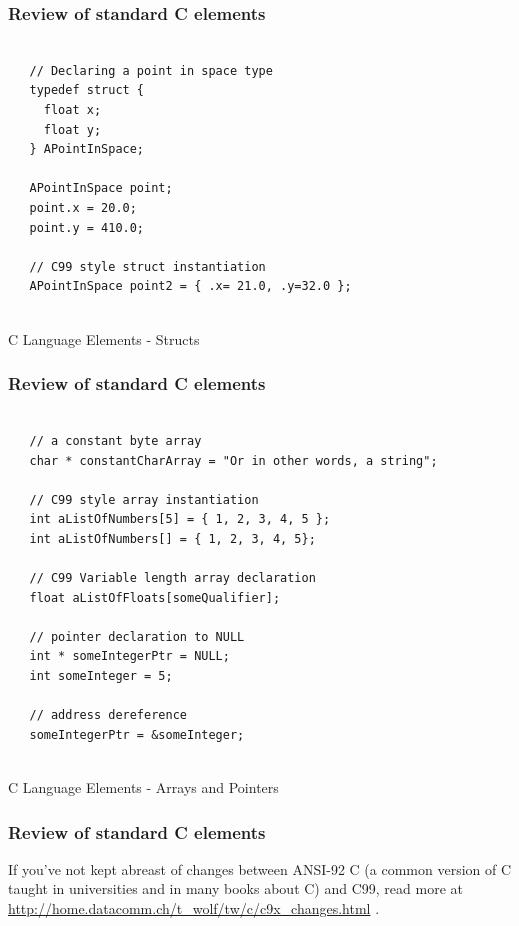 \documentclass[10pt]{beamer}
\begin{document}
\begin{frame}[fragile]
  \frametitle{Review of standard C elements}
  \begin{listing}[H]
     \begin{verbatim}
   
   // Declaring a point in space type
   typedef struct {
     float x;
     float y;
   } APointInSpace;
   
   APointInSpace point;
   point.x = 20.0;
   point.y = 410.0;
   
   // C99 style struct instantiation
   APointInSpace point2 = { .x= 21.0, .y=32.0 };
              
   \end{verbatim}
     \caption{C Language Elements - Structs}
     \label{listing:2}
   \end{listing}

\end{frame}

\begin{frame}[fragile]
  \frametitle{Review of standard C elements}
  \begin{listing}[H]
     \begin{verbatim}
   
   // a constant byte array
   char * constantCharArray = "Or in other words, a string";
   
   // C99 style array instantiation
   int aListOfNumbers[5] = { 1, 2, 3, 4, 5 };
   int aListOfNumbers[] = { 1, 2, 3, 4, 5};
   
   // C99 Variable length array declaration
   float aListOfFloats[someQualifier];
   
   // pointer declaration to NULL
   int * someIntegerPtr = NULL;
   int someInteger = 5;
   
   // address dereference
   someIntegerPtr = &someInteger;
               
   \end{verbatim}
     \caption{C Language Elements - Arrays and Pointers}
     \label{listing:3}
   \end{listing}

\end{frame}

\begin{frame}[fragile]
  \frametitle{Review of standard C elements}
  If you've not kept abreast of changes between ANSI-92 C (a common version of C taught in universities and in many books about C) and C99, read more at \url{http://home.datacomm.ch/t_wolf/tw/c/c9x_changes.html} \cite{C99Changes}.

\end{frame}
\end{document}
